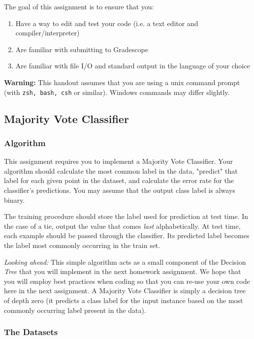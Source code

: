 \documentclass[11pt,addpoints,answers]{exam}
\begin{document}
The goal of this assignment is to ensure that you:
\begin{enumerate}
    \item Have a way to edit and test your code (i.e. a text editor and compiler/interpreter)
    \item Are familiar with submitting to Gradescope
    \item Are familiar with file I/O and standard output in the language of your choice
\end{enumerate}

\textbf{Warning:} This handout assumes that you are using a unix command prompt (with \texttt{zsh, bash, csh} or similar). Windows commands may differ slightly.

\subsection{Majority Vote Classifier}

\subsubsection{Algorithm}


This assignment requires you to implement a Majority Vote Classifier.  Your algorithm should calculate the most common label in the data, "predict" that label for each given point in the dataset, and calculate the error rate for the classifier's predictions. You may assume that the output class label is always binary. 

The training procedure should store the label used for prediction at test time. In the case of a tie, output the value that comes \emph{last} alphabetically. At test time, each example should be passed through the classifier. Its predicted label becomes the label most commonly occurring in the train set. 

\emph{Looking ahead:} This simple algorithm acts as a small component of the Decision \emph{Tree} that you will implement in the next homework assignment. We hope that you will employ best practices when coding so that you can re-use your own code here in the next assignment. A Majority Vote Classifier is simply a decision tree of depth zero (it predicts a class label for the input instance based on the most commonly occurring label present in the data).

\subsubsection{The Datasets}
\label{sec:data}
\end{document}
